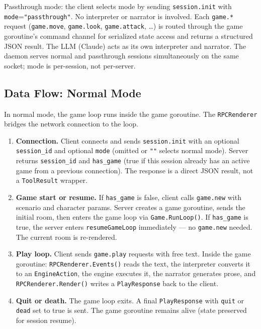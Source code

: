 \documentclass[a4paper,10pt]{article}
\newcommand{\field}[1]{\texttt{#1}}
\begin{document}
Passthrough mode: the client selects mode by sending
\texttt{session.init} with \field{mode}=\texttt{"passthrough"}.  No
interpreter or narrator is involved.  Each \texttt{game.*} request
(\texttt{game.move}, \texttt{game.look}, \texttt{game.attack}, \dots)
is routed through the game goroutine's command channel for
serialized state access and returns a structured JSON result.  The
LLM (Claude) acts as its own interpreter and narrator.  The daemon
serves normal and passthrough sessions simultaneously on the same
socket; mode is per-session, not per-server.

\subsection{Data Flow: Normal Mode}

In normal mode, the game loop runs inside the game goroutine.  The
\texttt{RPCRenderer} bridges the network connection to the loop.

\begin{enumerate}
  \item \textbf{Connection.}
    Client connects and sends \texttt{session.init} with an optional
    \field{session\_id} and optional \field{mode} (omitted or
    \texttt{""} selects normal mode).  Server returns
    \field{session\_id} and \field{has\_game} (true if this session
    already has an active game from a previous connection).  The
    response is a direct JSON result, not a \texttt{ToolResult}
    wrapper.
  \item \textbf{Game start or resume.}
    If \field{has\_game} is false, client calls \texttt{game.new}
    with scenario and character params.  Server creates a game
    goroutine, sends the initial room, then enters the game loop via
    \texttt{Game.RunLoop()}.  If \field{has\_game} is true, the
    server enters \texttt{resume\-Game\-Loop} immediately --- no
    \texttt{game.new} needed.  The current room is re-rendered.
  \item \textbf{Play loop.}
    Client sends \texttt{game.play} requests with free text.  Inside
    the game goroutine: \texttt{RPC\-Renderer.\-Events()} reads
    the text, the interpreter converts it to an
    \texttt{Engine\-Action}, the engine executes it, the narrator
    generates prose, and \texttt{RPC\-Renderer.\-Render()} writes
    a \texttt{Play\-Response} back to the client.
  \item \textbf{Quit or death.}
    The game loop exits.  A final \texttt{PlayResponse} with
    \field{quit} or \field{dead} set to true is sent.  The game
    goroutine remains alive (state preserved for session resume).
\end{enumerate}
\end{document}
